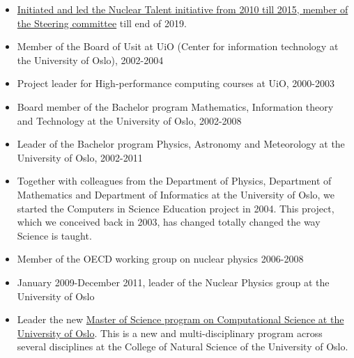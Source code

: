 \documentclass[%
oneside,                 %
final,                   %
10pt]{article}
\begin{document}
\begin{itemize}
\item \href{{http://www.nucleartalent.org/}}{Initiated and led the Nuclear Talent initiative from 2010 till 2015, member of the Steering committee} till end of 2019.

\item Member of the Board of Usit at UiO (Center for information technology at the University of Oslo), 2002-2004

\item Project leader for High-performance computing courses at UiO, 2000-2003

\item Board member of the Bachelor program Mathematics, Information theory and Technology at the University of Oslo, 2002-2008

\item Leader of the Bachelor program Physics, Astronomy and Meteorology at the University of Oslo, 2002-2011

\item Together with colleagues from the Department of Physics, Department of Mathematics and Department of Informatics at the University of Oslo, we started   the Computers in Science Education project in 2004. This project, which we conceived back in 2003,  has changed totally changed the way Science is taught.

\item Member of the OECD working group on nuclear physics 2006-2008

\item January 2009-December 2011, leader of the Nuclear Physics group at the University of Oslo

\item Leader the new \href{{http://www.uio.no/english/studies/programmes/computational-science-master/}}{Master of Science program on Computational Science at the University of Oslo}. This is a new and multi-disciplinary program across several disciplines at the College of Natural Science of the University of Oslo. 
\end{itemize}

\noindent
\end{document}

